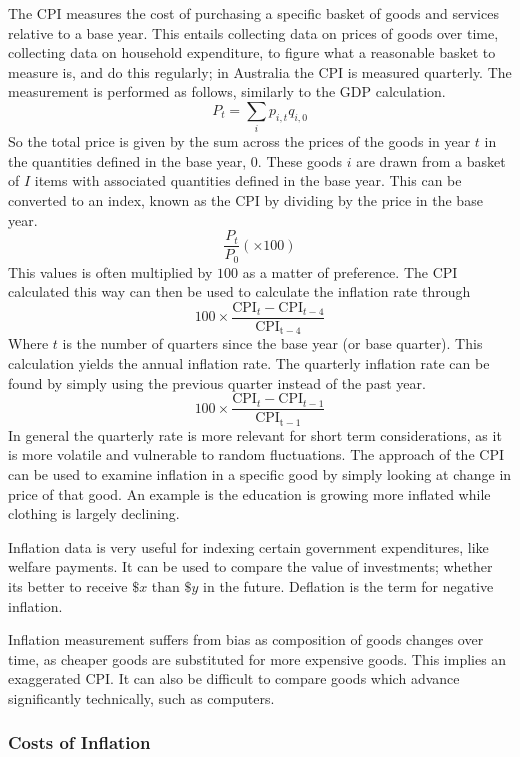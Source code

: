 \documentclass[12pt]{report}
\begin{document}
\begin{flushleft}
The CPI measures the cost of purchasing a specific basket of goods and services
relative to a base year. This entails collecting data on prices of goods over 
time, collecting data on household expenditure, to figure what a reasonable 
basket to measure is, and do this regularly; in Australia the CPI is measured
quarterly. The measurement is performed as follows, similarly to the GDP 
calculation.
\[P_t = \sum_i p_{i,t}q_{i,0}\]
So the total price is given by the sum across the prices of the goods in year
\(t\) in the quantities defined in the base year, \(0\). These goods \(i\) are
drawn from a basket of \(I\) items with associated quantities defined in the 
base year. This can be converted to an index, known as the CPI by dividing by 
the price in the base year.
\[\frac{P_t}{P_0} (\times 100)\]
This values is often multiplied by \(100\) as a matter of preference. The CPI
calculated this way can then be used to calculate the inflation rate through
\[100 \times \frac{\mathrm{CPI}_t - 
\mathrm{CPI}_{t - 4}}{\mathrm{CPI_{t - 4}}}\]
Where \(t\) is the number of quarters since the base year (or base quarter).
This calculation yields the annual inflation rate. The quarterly inflation rate
can be found by simply using the previous quarter instead of the past year.
\[100 \times \frac{\mathrm{CPI}_t - 
\mathrm{CPI}_{t - 1}}{\mathrm{CPI_{t - 1}}}\]
In general the quarterly rate is more relevant for short term considerations,
as it is more volatile and vulnerable to random fluctuations. The approach of 
the CPI can be used to examine inflation in a specific good by simply looking 
at change in price of that good. An example is the education is growing more
inflated while clothing is largely declining. \par
Inflation data is very useful for indexing certain government expenditures, 
like welfare payments. It can be used to compare the value of investments; 
whether its better to receive \(\$x\) than \(\$y\) in the future.
Deflation is the term for negative inflation. \par
Inflation measurement suffers from bias as composition of goods changes over
time, as cheaper goods are substituted for more expensive goods. This implies
an exaggerated CPI. It can also be difficult to compare goods which advance
significantly technically, such as computers.

\subsubsection*{Costs of Inflation}


\end{flushleft}
\end{document}
